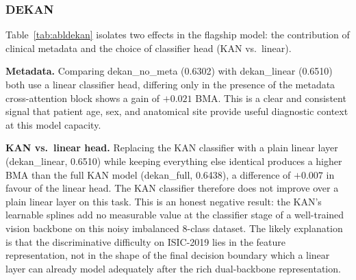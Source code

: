 \begin{table}[!t]
\centering
\caption{Lightweight hybrid ablation (TTA BMA). All four variants were trained
and evaluated.}
\label{tab:ablhybrid}
\end{table}

\subsubsection{DEKAN}
\label{sec:ablations}

Table~\ref{tab:abldekan} isolates two effects
in the flagship model: the contribution of clinical metadata and the choice of
classifier head (KAN vs.\ linear).

\textbf{Metadata.} Comparing dekan\_no\_meta (0.6302) with dekan\_linear
(0.6510) both use a linear classifier head, differing only in the presence of
the metadata cross-attention block shows a gain of $+0.021$ BMA. This is a
clear and consistent signal that patient age, sex, and anatomical site provide
useful diagnostic context at this model capacity.

\textbf{KAN vs.\ linear head.} Replacing the KAN classifier with a plain linear
layer (dekan\_linear, 0.6510) while keeping everything else identical produces a
higher BMA than the full KAN model (dekan\_full, 0.6438), a difference of
$+0.007$ in favour of the linear head. The KAN classifier therefore does not
improve over a plain linear layer on this task. This is an honest negative result:
the KAN's learnable splines add no measurable value at the classifier stage of a
well-trained vision backbone on this noisy imbalanced 8-class dataset. The
likely explanation is that the discriminative difficulty on ISIC-2019 lies in the
feature representation, not in the shape of the final decision boundary which a
linear layer can already model adequately after the rich dual-backbone
representation.

